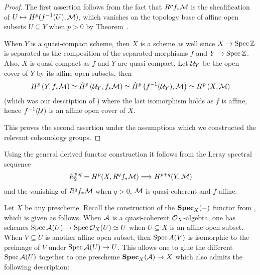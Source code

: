 \documentclass[a4paper,parskip=half,numbers=enddot, DIV=12]{scrreprt}
\begin{document}
\begin{proof}
	The first assertion follows from the fact that $R^pf_*\mathcal{M}$ is the sheafification of $U\mapsto H^p(f^{-1}(U),\mathcal{M})$, which vanishes on the topology base of affine open subsets $U\subseteq Y$ when $p>0$ by Theorem~.
	
	When $Y$ is a quasi-compact scheme, then $X$ is a scheme as well since $X\morphism\Spec \IZ$ is separated as the composition of the separated morphisms $f$ and $Y\morphism\Spec \IZ$. Also, $X$ is quasi-compact as $f$ and $Y$ are quasi-compact. Let $\mathcal{U}_Y$ be the open cover of $Y$ by its affine open subsets, then
	\begin{align*}
		H^p\left(Y,f_*\mathcal{M}\right)\simeq \check{H}^p\left(\mathcal{U}_Y,f_*\mathcal{M}\right)\simeq \check{H}^p\left(f^{-1}(\mathcal{U}_Y),\mathcal{M}\right)\simeq H^p\left(X,\mathcal{M}\right)
	\end{align*}
	(which was our description of ) where the last isomorphism holds as $f$ is affine, hence $f^{-1}(\mathcal{U})$ is an affine open cover of $X$.
	
	This proves the second assertion under the assumptions which we constructed the relevant cohomology groups.
\end{proof}
\begin{rem*}
	Using the general derived functor construction it follows from the Leray spectral sequence
	\begin{align*}
		E_2^{p,q}=H^p(X,R^qf_*\Mm)\converge H^{p+q}(Y,\Mm)
	\end{align*}
	and the vanishing of $R^qf_*\mathcal{M}$ when $q>0$, $\mathcal{M}$ is quasi-coherent and $f$ affine.
\end{rem*}
Let $X$ be any prescheme. Recall the construction of the $\operatorname{\mathbf{Spec}}_X(-)$ functor from \cite[Subsection~2.5.1]{alggeo1}, which is given as follows. When $\mathcal{A}$ is a quasi-coherent $\mathcal{O}_X$-algebra, one has schemes $\Spec \Aa(U)\morphism \Spec \Oo_X(U)\simeq U$ when $U\subseteq X$ is an affine open subset. When $V\subseteq U$ is another affine open subset, then $\operatorname{Spec} A(V)$ is isomorphic to the preimage of $V$ under $\Spec \Aa(U)\morphism U$. This allows one to glue the different $\operatorname{Spec} \mathcal{A}(U)$ together to one prescheme $\SPEC_X(\Aa)\morphism X$ which also admits the following description:
\end{document}
